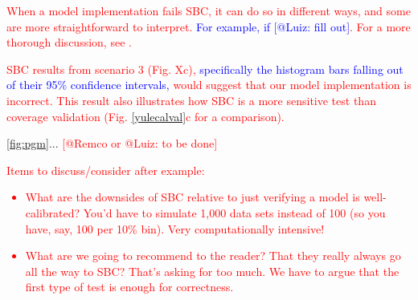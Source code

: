 \documentclass[oneside]{article}
\begin{document}
\textcolor{red}{When a model implementation fails SBC, it can do so in different ways, and some are more straightforward to interpret.
\textcolor{blue}{For example, if [@Luiz: fill out]}.
For a more thorough discussion, see \cite{Talts2018}.}

\textcolor{red}{SBC results from scenario 3 (Fig. Xc), \textcolor{blue}{specifically the histogram bars falling out of their 95\% confidence intervals, }would suggest that our model implementation is incorrect.
This result also illustrates how SBC is a more sensitive test than coverage validation (Fig. \ref{yulecalval}c for a comparison).
}

\ref{fig:pgm}... \textcolor{red}{[@Remco or @Luiz: to be done]}

\textcolor{red}{
  Items to discuss/consider after example:
  \begin{itemize}
  \item What are the downsides of SBC relative to just verifying
    a model is well-calibrated? You'd have to simulate 1,000
    data sets instead of 100 (so you have, say, 100 per 10\% bin).
    Very computationally intensive!
  \item What are we going to recommend to the reader? That they
    really always go all the way to SBC? That's asking for too much.
    We have to argue that the first type of test is enough for
    correctness.
  \end{itemize}
}
\end{document}
